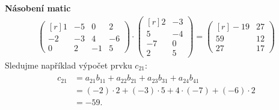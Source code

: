 \begin{mdframed}[style=mdexam]
  \begin{example}\label{mai:exam087}
    \textbf{Násobení matic}
    \begingroup
    \renewcommand\arraystretch{1.0}
      \renewcommand\arraycolsep{3pt}
      \begin{gather*}
        \begin{pmatrix*}[r]
            1 & -5 &  0 &  2 \\
          -2 & -3 &  4 & -6 \\
            0 &  2 & -1 &  5
        \end{pmatrix*} \cdot
        \begin{pmatrix*}[r]
            2 & -3 \\
            5 & -4 \\
            -7 &  0 \\
            2 &  5
        \end{pmatrix*} = 
        \begin{pmatrix*}[r]
          -19 & 27 \\
            59 & 12 \\
            27 & 17
        \end{pmatrix*} 
      \end{gather*} 
    \endgroup
    Sledujme například výpočet prvku \(c_{21}\):
    \begin{gather*}
      \begin{align*}
        c_{21} &= a_{21}b_{11} + a_{22}b_{21} + a_{23}b_{31} + a_{24}b_{41}  \\
               &= (-2)\cdot2 + (-3)\cdot5 + 4\cdot(-7) + (-6)\cdot2 \\
               &= -59.
      \end{align*} 
    \end{gather*}
  \end{example}
\end{mdframed}